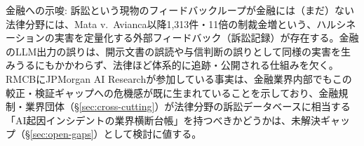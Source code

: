 \begin{insight}{金融への示唆: 訴訟という現物のフィードバックループが金融には（まだ）ない}
法律分野には、Mata v.\ Avianca以降1,313件・11倍の制裁金増という、ハルシネーションの実害を定量化する外部フィードバック（訴訟記録）が存在する。金融のLLM出力の誤りは、開示文書の誤読や与信判断の誤りとして同様の実害を生みうるにもかかわらず、法律ほど体系的に追跡・公開される仕組みを欠く。RMCBにJPMorgan AI Researchが参加している事実は、金融業界内部でもこの較正・検証ギャップへの危機感が既に生まれていることを示しており、金融規制・業界団体（\S\ref{sec:cross-cutting}）が法律分野の訴訟データベースに相当する「AI起因インシデントの業界横断台帳」を持つべきかどうかは、未解決ギャップ（\S\ref{sec:open-gaps}）として検討に値する。
\end{insight}
